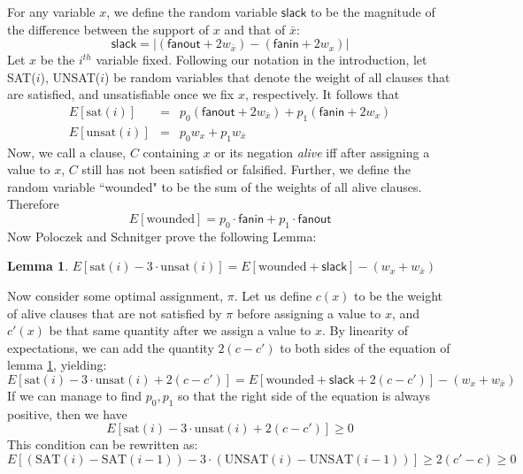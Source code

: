 \documentclass[11pt,letter]{article}
\newtheorem{lemma}{Lemma}
\begin{document}
For any variable $x$, we define the random variable $\mathsf{slack}$ to be the magnitude of the difference between the support of $x$ and that of $\bar{x}$:
\begin{equation}
\mathsf{slack} = |(\mathsf{fanout} + 2w_{\bar{x}}) -(\mathsf{fanin} + 2w_x)|
\end{equation}
Let $x$ be the $i^{th}$ variable fixed. Following our notation in the introduction, let SAT($i$), UNSAT($i$) be random variables that denote the weight of all clauses that are satisfied, and unsatisfiable once we fix $x$, respectively. It follows that
\begin{eqnarray}
E[\mathrm{sat}(i)] &=& p_0(\mathsf{fanout} + 2w_{\bar{x}}) + p_1(\mathsf{fanin} + 2w_{x})\\
E[\mathrm{unsat}(i)] &=& p_0w_x + p_1w_{\bar{x}}
\end{eqnarray}
Now, we call a clause, $C$ containing $x$ or its negation \textit{alive} iff after assigning a value to $x$, $C$ still has not been satisfied or falsified. Further, we define the random variable ``wounded" to be the sum of the weights of all alive clauses. Therefore
\begin{equation}
E[\mathrm{wounded}] = p_0 \cdot \mathsf{fanin} + p_1 \cdot \mathsf{fanout}
\end{equation}
Now Poloczek and Schnitger prove the following Lemma:
\begin{lemma} \label{L:2}
$E[\mathrm{sat}(i) - 3\cdot\mathrm{unsat}(i)] = E[\mathrm{wounded} + \mathsf{slack}] - (w_x + w_{\bar{x}})$
\end{lemma}
Now consider some optimal assignment, $\pi$. Let us define $c(x)$ to be the weight of alive clauses that are not satisfied by $\pi$ before assigning a value to $x$, and $c'(x)$ be that same quantity after we assign a value to $x$. By linearity of expectations, we can add the quantity $2(c-c')$ to both sides of the equation of lemma \ref{L:2}, yielding:
\begin{equation}
E[\mathrm{sat}(i) - 3\cdot\mathrm{unsat}(i)+ 2(c-c')] = E[\mathrm{wounded} + \mathsf{slack} + 2(c-c')] - (w_x + w_{\bar{x}})
\end{equation}
If we can manage to find $p_0,p_1$ so that the right side of the equation is always positive, then we have
\begin{equation}
E[\mathrm{sat}(i) - 3\cdot\mathrm{unsat}(i)+ 2(c-c')] \ge 0 \label{C:1}
\end{equation}
This condition can be rewritten as:
\begin{equation}
E[(\mathrm{SAT}(i) - \mathrm{SAT}(i-1)) - 3\cdot(\mathrm{UNSAT}(i) - \mathrm{UNSAT}(i-1))] \ge  2(c'-c) \ge 0
\end{equation}
\end{document}
